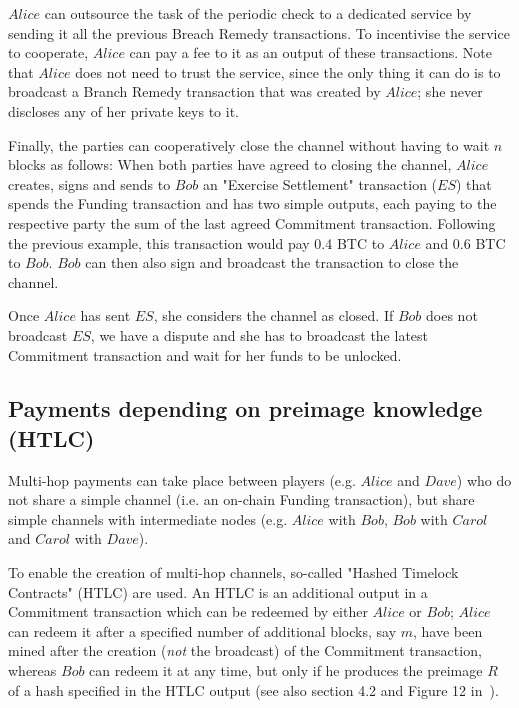     $Alice$ can outsource the task of the periodic check to a dedicated service by sending
    it all the previous Breach Remedy transactions. To incentivise the service to
    cooperate, $Alice$ can pay a fee to it as an output of these transactions. Note that
    $Alice$ does not need to trust the service, since the only thing it can do is to
    broadcast a Branch Remedy transaction that was created by $Alice$; she never discloses
    any of her private keys to it.

    Finally, the parties can cooperatively close the channel without having to wait $n$
    blocks as follows: When both parties have agreed to closing the channel, $Alice$
    creates, signs and sends to $Bob$ an "Exercise Settlement" transaction ($ES$) that
    spends the Funding transaction and has two simple outputs, each paying to the
    respective party the sum of the last agreed Commitment transaction. Following the
    previous example, this transaction would pay 0.4 BTC to $Alice$ and 0.6 BTC to $Bob$.
    $Bob$ can then also sign and broadcast the transaction to close the channel.

    Once $Alice$ has sent $ES$, she considers the channel as closed. If $Bob$ does not
    broadcast $ES$, we have a dispute and she has to broadcast the latest Commitment
    transaction and wait for her funds to be unlocked.

  \subsection{Payments depending on preimage knowledge (HTLC)}
    Multi-hop payments can take place between players (e.g. $Alice$ and $Dave$) who do not
    share a simple channel (i.e. an on-chain Funding transaction), but share simple
    channels with intermediate nodes (e.g. $Alice$ with $Bob$, $Bob$ with $Carol$ and
    $Carol$ with $Dave$).

    To enable the creation of multi-hop channels, so-called "Hashed Timelock Contracts"
    (HTLC) are used. An HTLC is an additional output in a Commitment transaction which can
    be redeemed by either $Alice$ or $Bob$; $Alice$ can redeem it after a specified number
    of additional blocks, say $m$, have been mined after the creation (\textit{not} the
    broadcast) of the Commitment transaction, whereas $Bob$ can redeem it at any time, but
    only if he produces the preimage $R$ of a hash specified in the HTLC output (see also
    section 4.2 and Figure 12 in~\cite{lightning}).

